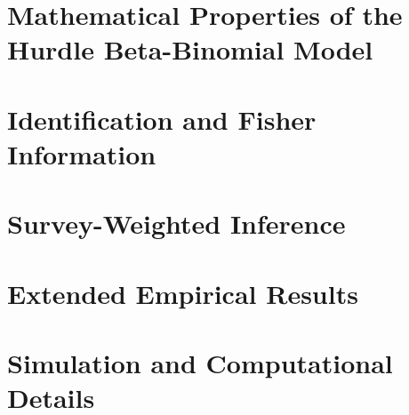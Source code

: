 

\section{Mathematical Properties of the Hurdle Beta-Binomial Model}
\label{app:math-properties}




\section{Identification and Fisher Information}
\label{app:identification}




\section{Survey-Weighted Inference}
\label{app:survey}




\section{Extended Empirical Results}
\label{app:extended-results}




\section{Simulation and Computational Details}
\label{app:sim-computation}


